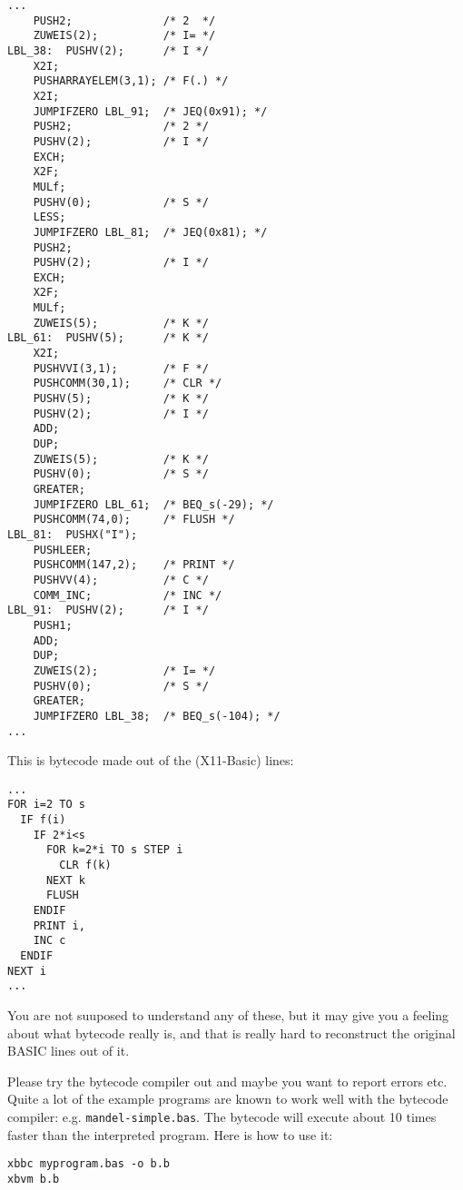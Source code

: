 \begin{mdframed}[hidealllines=true,backgroundcolor=green!20]
{\footnotesize
\begin{verbatim}
...
    PUSH2;              /* 2  */
    ZUWEIS(2);          /* I= */
LBL_38:  PUSHV(2);      /* I */
    X2I;
    PUSHARRAYELEM(3,1); /* F(.) */
    X2I;
    JUMPIFZERO LBL_91;	/* JEQ(0x91); */
    PUSH2;              /* 2 */
    PUSHV(2);           /* I */
    EXCH;
    X2F;
    MULf;
    PUSHV(0);           /* S */
    LESS;
    JUMPIFZERO LBL_81;	/* JEQ(0x81); */
    PUSH2;
    PUSHV(2);           /* I */
    EXCH;
    X2F;
    MULf;
    ZUWEIS(5);          /* K */
LBL_61:  PUSHV(5);      /* K */
    X2I;
    PUSHVVI(3,1);       /* F */
    PUSHCOMM(30,1);     /* CLR */
    PUSHV(5);           /* K */
    PUSHV(2);           /* I */
    ADD;
    DUP;
    ZUWEIS(5);          /* K */
    PUSHV(0);           /* S */
    GREATER;
    JUMPIFZERO LBL_61;	/* BEQ_s(-29); */
    PUSHCOMM(74,0);     /* FLUSH */
LBL_81:  PUSHX("I"); 
    PUSHLEER;
    PUSHCOMM(147,2);    /* PRINT */
    PUSHVV(4);          /* C */
    COMM_INC;           /* INC */
LBL_91:  PUSHV(2);      /* I */
    PUSH1;
    ADD;
    DUP;
    ZUWEIS(2);          /* I= */
    PUSHV(0);           /* S */
    GREATER;
    JUMPIFZERO LBL_38;  /* BEQ_s(-104); */
...
\end{verbatim}
}
\end{mdframed}
This is bytecode made out of the (X11-Basic) lines:
\begin{mdframed}[hidealllines=true,backgroundcolor=blue!20]
{\footnotesize
\begin{verbatim}
...
FOR i=2 TO s
  IF f(i)
    IF 2*i<s
      FOR k=2*i TO s STEP i
        CLR f(k)
      NEXT k
      FLUSH
    ENDIF
    PRINT i,
    INC c
  ENDIF
NEXT i
...
\end{verbatim}
}
\end{mdframed}

You are not suuposed to understand any of these, but it may give you a 
feeling about what bytecode really is, and that is really hard to reconstruct
the original BASIC lines out of it.

Please try the bytecode compiler out and maybe you want to report errors etc.
Quite a lot of the example programs are known to work well with the bytecode
compiler:  e.g. \verb|mandel-simple.bas|. The bytecode will execute about 10
times faster than the interpreted program. Here is how to use it:

\begin{mdframed}[hidealllines=true,backgroundcolor=black!20]
\begin{verbatim}
xbbc myprogram.bas -o b.b
xbvm b.b
\end{verbatim}
\end{mdframed}

